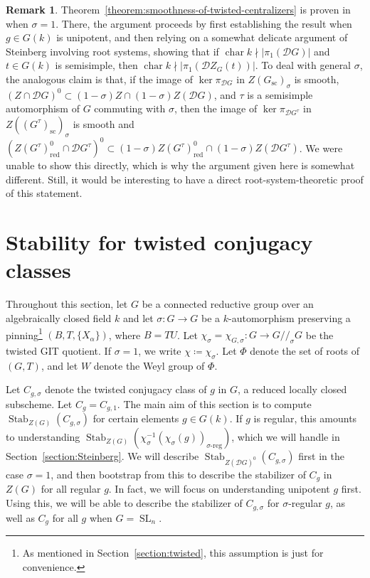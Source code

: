 \documentclass[11pt,reqno]{amsart}
\theoremstyle{definition}
\newtheorem{remark}[theorem]{Remark}
\renewcommand{\rm}{\mathrm}
\newcommand{\sD}{{\mathscr D}}
\DeclareMathOperator{\chara}{char}
\DeclareMathOperator{\SL}{SL}
\DeclareMathOperator{\Stab}{Stab}
\begin{document}
\begin{remark}
    Theorem~\ref{theorem:smoothness-of-twisted-centralizers} is proven in \cite[Corollary 3.5]{Integral-Springer} when $\sigma = 1$. There, the argument proceeds by first establishing the result when $g \in G(k)$ is unipotent, and then relying on a somewhat delicate argument of Steinberg involving root systems, showing that if $\chara k \nmid |\pi_1(\sD G)|$ and $t \in G(k)$ is semisimple, then $\chara k \nmid |\pi_1(\sD Z_G(t))|$. To deal with general $\sigma$, the analogous claim is that, if the image of $\ker \pi_{\sD G}$ in $Z(G_{\mathrm{sc}})_\sigma$ is smooth, $(Z \cap \sD G)^0 \subset (1-\sigma)Z \cap (1-\sigma)Z(\sD G)$, and $\tau$ is a semisimple automorphism of $G$ commuting with $\sigma$, then the image of $\ker \pi_{\sD G^\tau}$ in $Z((G^\tau)_{\mathrm{sc}})_\sigma$ is smooth and $(Z(G^\tau)^0_{\rm{red}} \cap \sD G^\tau)^0 \subset (1-\sigma)Z(G^\tau)^0_{\rm{red}} \cap (1-\sigma)Z(\sD G^\tau)$. We were unable to show this directly, which is why the argument given here is somewhat different. Still, it would be interesting to have a direct root-system-theoretic proof of this statement.
\end{remark}










\section{Stability for twisted conjugacy classes}\label{section:stability}

Throughout this section, let $G$ be a connected reductive group over an algebraically closed field $k$ and let $\sigma\colon G \to G$ be a $k$-automorphism preserving a pinning\footnote{As mentioned in Section~\ref{section:twisted}, this assumption is just for convenience.} $(B, T, \{X_\alpha\})$, where $B = TU$. Let $\chi_\sigma = \chi_{G, \sigma}\colon G \to G/\!/_\sigma G$ be the twisted GIT quotient. If $\sigma = 1$, we write $\chi \coloneqq \chi_\sigma$. Let $\Phi$ denote the set of roots of $(G, T)$, and let $W$ denote the Weyl group of $\Phi$.

Let $C_{g,\sigma}$ denote the twisted conjugacy class of $g$ in $G$, a reduced locally closed subscheme. Let $C_g = C_{g,1}$. The main aim of this section is to compute $\Stab_{Z(G)}(C_{g,\sigma})$ for certain elements $g \in G(k)$. If $g$ is regular, this amounts to understanding $\Stab_{Z(G)}(\chi_\sigma^{-1}(\chi_\sigma(g))_{\sigma\textrm{-}\rm{reg}})$, which we will handle in Section~\ref{section:Steinberg}. We will describe $\Stab_{Z(\sD G)^0}(C_{g,\sigma})$ first in the case $\sigma = 1$, and then bootstrap from this to describe the stabilizer of $C_g$ in $Z(G)$ for all regular $g$. In fact, we will focus on understanding unipotent $g$ first. Using this, we will be able to describe the stabilizer of $C_{g,\sigma}$ for $\sigma$-regular $g$, as well as $C_g$ for all $g$ when $G = \SL_n$.
\end{document}
